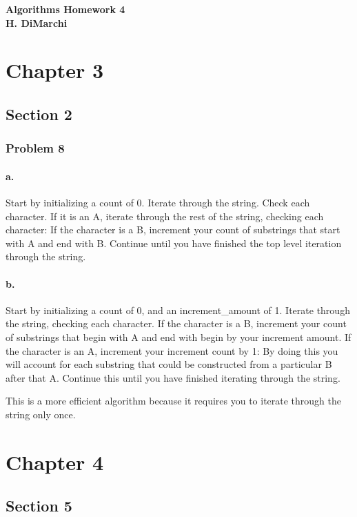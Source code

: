 \documentclass{article}
\begin{document}
%
\normalsize%
\begin{titlepage}
  \centering
  \vfill
  {\bfseries\Large
      Algorithms Homework 4\\
      H. DiMarchi\\
  }
  \vfill
\end{titlepage}
\newpage
\section{Chapter 3}
  \subsection{Section 2}
    \subsubsection{Problem 8}
      \paragraph{a.}
        Start by initializing a count of 0.
        Iterate through the string. Check each character. If it is an A, iterate
        through the rest of the string, checking each character: If the character
        is a B, increment your count of substrings that start with A and end with B.
        Continue until you have finished the top level iteration through the string.
      \paragraph{b.}
        Start by initializing a count of 0, and an increment\_amount of 1.
        Iterate through the string, checking each character. If the character
        is a B, increment your count of substrings that begin with A and end with begin
        by your increment amount. If the character is an A,
        increment your increment count by 1: By doing this you will account for
        each substring that could be constructed from a particular B after that A.
        Continue this until you have finished iterating through the string.

        This is a more efficient algorithm because it requires you to iterate
        through the string only once.
    \section{Chapter 4}
      \subsection{Section 5}
\end{document}
